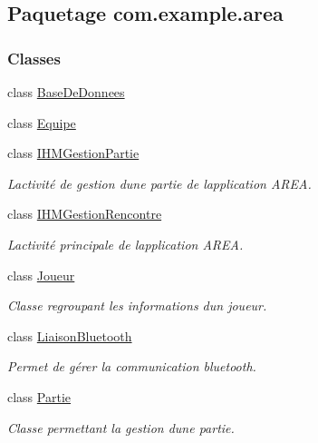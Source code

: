 \hypertarget{namespacecom_1_1example_1_1area}{}\subsection{Paquetage com.\+example.\+area}
\label{namespacecom_1_1example_1_1area}
\subsubsection*{Classes}
\begin{DoxyCompactItemize}
\item 
class \hyperlink{classcom_1_1example_1_1area_1_1_base_de_donnees}{Base\+De\+Donnees}
\item 
class \hyperlink{classcom_1_1example_1_1area_1_1_equipe}{Equipe}
\item 
class \hyperlink{classcom_1_1example_1_1area_1_1_i_h_m_gestion_partie}{I\+H\+M\+Gestion\+Partie}
\begin{DoxyCompactList}\small\item\em L\textquotesingle{}activité de gestion d\textquotesingle{}une partie de l\textquotesingle{}application A\+R\+EA. \end{DoxyCompactList}\item 
class \hyperlink{classcom_1_1example_1_1area_1_1_i_h_m_gestion_rencontre}{I\+H\+M\+Gestion\+Rencontre}
\begin{DoxyCompactList}\small\item\em L\textquotesingle{}activité principale de l\textquotesingle{}application A\+R\+EA. \end{DoxyCompactList}\item 
class \hyperlink{classcom_1_1example_1_1area_1_1_joueur}{Joueur}
\begin{DoxyCompactList}\small\item\em Classe regroupant les informations d\textquotesingle{}un joueur. \end{DoxyCompactList}\item 
class \hyperlink{classcom_1_1example_1_1area_1_1_liaison_bluetooth}{Liaison\+Bluetooth}
\begin{DoxyCompactList}\small\item\em Permet de gérer la communication bluetooth. \end{DoxyCompactList}\item 
class \hyperlink{classcom_1_1example_1_1area_1_1_partie}{Partie}
\begin{DoxyCompactList}\small\item\em Classe permettant la gestion d\textquotesingle{}une partie. \end{DoxyCompactList}\item 

\end{DoxyCompactItemize}
